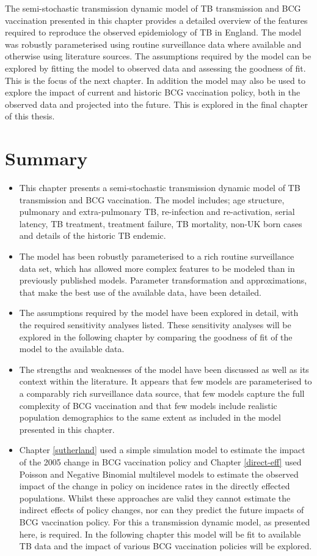 \documentclass[11pt,twoside]{bristolthesis}
\begin{document}
  The semi-stochastic transmission dynamic model of TB transmission and BCG vaccination presented in this chapter provides a detailed overview of the features required to reproduce the observed epidemiology of TB in England. The model was robustly parameterised using routine surveillance data where available and otherwise using literature sources. The assumptions required by the model can be explored by fitting the model to observed data and assessing the goodness of fit. This is the focus of the next chapter. In addition the model may also be used to explore the impact of current and historic BCG vaccination policy, both in the observed data and projected into the future. This is explored in the final chapter of this thesis.
  
  \hypertarget{summary-7}{%
  \section{Summary}\label{summary-7}}
  \begin{itemize}
  \item
    This chapter presents a semi-stochastic transmission dynamic model of TB transmission and BCG vaccination. The model includes; age structure, pulmonary and extra-pulmonary TB, re-infection and re-activation, serial latency, TB treatment, treatment failure, TB mortality, non-UK born cases and details of the historic TB endemic.
  \item
    The model has been robustly parameterised to a rich routine surveillance data set, which has allowed more complex features to be modeled than in previously published models. Parameter transformation and approximations, that make the best use of the available data, have been detailed.
  \item
    The assumptions required by the model have been explored in detail, with the required sensitivity analyses listed. These sensitivity analyses will be explored in the following chapter by comparing the goodness of fit of the model to the available data.
  \item
    The strengths and weaknesses of the model have been discussed as well as its context within the literature. It appears that few models are parameterised to a comparably rich surveillance data source, that few models capture the full complexity of BCG vaccination and that few models include realistic population demographics to the same extent as included in the model presented in this chapter.
  \item
    Chapter \ref{sutherland} used a simple simulation model to estimate the impact of the 2005 change in BCG vaccination policy and Chapter \ref{direct-eff} used Poisson and Negative Binomial multilevel models to estimate the observed impact of the change in policy on incidence rates in the directly effected populations. Whilst these approaches are valid they cannot estimate the indirect effects of policy changes, nor can they predict the future impacts of BCG vaccination policy. For this a transmission dynamic model, as presented here, is required. In the following chapter this model will be fit to available TB data and the impact of various BCG vaccination policies will be explored.
  \end{itemize}
\end{document}
